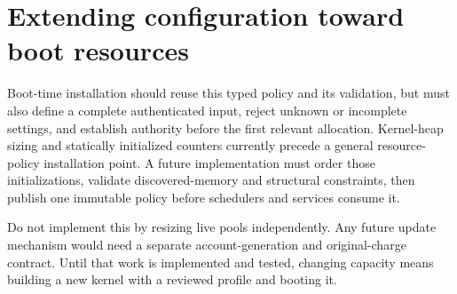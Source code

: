 \section{Extending configuration toward boot resources}

Boot-time installation should reuse this typed policy and its validation, but
must also define a complete authenticated input, reject unknown or incomplete
settings, and establish authority before the first relevant allocation.
Kernel-heap sizing and statically initialized counters currently precede a
general resource-policy installation point. A future implementation must order
those initializations, validate discovered-memory and structural constraints,
then publish one immutable policy before schedulers and services consume it.

Do not implement this by resizing live pools independently. Any future update
mechanism would need a separate account-generation and original-charge contract.
Until that work is implemented and tested, changing capacity means building a
new kernel with a reviewed profile and booting it.

\endinput
